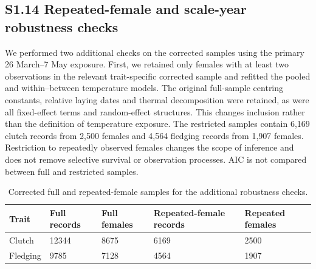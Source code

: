 \documentclass{article}
\begin{document}
\subsection{S1.14 Repeated-female and scale-year robustness checks}

We performed two additional checks on the corrected samples using the primary 26 March--7 May exposure. First, we retained only females with at least two observations in the relevant trait-specific corrected sample and refitted the pooled and within--between temperature models. The original full-sample centring constants, relative laying dates and thermal decomposition were retained, as were all fixed-effect terms and random-effect structures. This changes inclusion rather than the definition of temperature exposure. The restricted samples contain 6,169 clutch records from 2,500 females and 4,564 fledging records from 1,907 females. Restriction to repeatedly observed females changes the scope of inference and does not remove selective survival or observation processes. AIC is not compared between full and restricted samples.

\begin{table}[!ht]\centering\scriptsize\singlespacing
\caption{Corrected full and repeated-female samples for the additional robustness checks.}\label{tab:repeat-samples}
\begin{tabular}{lllll}\toprule
Trait & Full records & Full females & Repeated-female records & Repeated females\\\midrule
Clutch & 12344 & 8675 & 6169 & 2500\\
Fledging & 9785 & 7128 & 4564 & 1907\\
\bottomrule\end{tabular}\end{table}

\begin{table}[!ht]\centering\scriptsize\singlespacing
\caption{Validated temperature contrasts on the repeated-female samples. Mean changes are eggs or percentage points of full-mixture fledging success per 1-degree increase. Consistency ratios refer to conditional clutch-size SD or beta-binomial component precision. Other continuous covariates and random effects are zero, and reference age class is yearling. Intervals use 6,000 joint coefficient draws. The clutch within--between fit did not pass numerical validation and is not reported.}\label{tab:repeat-temperature}
\end{table}
\end{document}
